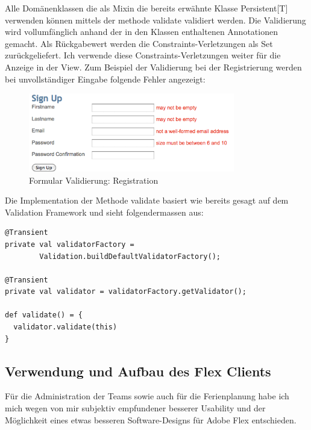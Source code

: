 Alle Dom\"anenklassen die als Mixin die bereits erw\"ahnte Klasse Persistent[T] verwenden k\"onnen mittels der methode validate validiert werden. Die Validierung wird vollumf\"anglich anhand der in den Klassen enthaltenen Annotationen gemacht. Als R\"uckgabewert werden die Constraints-Verletzungen als Set zur\"uckgeliefert. Ich verwende diese Constraints-Verletzungen weiter f\"ur die Anzeige in der View. Zum Beispiel der Validierung bei der Registrierung werden bei unvollst\"andiger Eingabe folgende Fehler angezeigt:
 \begin{figure}[H]
  	\centering
    	\includegraphics[width=9cm]{images/validation_registration}
        	\caption{Formular Validierung: Registration}
\end{figure}


Die Implementation der Methode validate basiert wie bereits gesagt auf dem Validation Framework und sieht folgendermassen aus:
\begin{lstlisting}[caption=Validation innerhalb der Klasse Persistence]
@Transient
private val validatorFactory = 
		Validation.buildDefaultValidatorFactory();

@Transient
private val validator = validatorFactory.getValidator();
  
def validate() = {
  validator.validate(this)
}
\end{lstlisting}

\subsection{Verwendung und Aufbau des Flex Clients}
F\"ur die Administration der Teams sowie auch f\"ur die Ferienplanung habe ich mich wegen von mir subjektiv empfundener besserer Usability und der M\"oglichkeit eines etwas besseren Software-Designs f\"ur Adobe Flex entschieden. 
